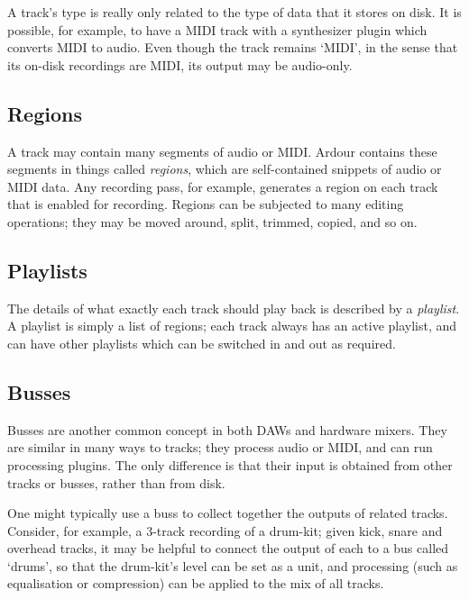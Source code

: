 \documentclass[10pt,a4paper]{book}
\begin{document}
\begin{danger}
A track's type is really only related to the type of data that it
stores on disk.  It is possible, for example, to have a MIDI track
with a synthesizer plugin which converts MIDI to audio.  Even though
the track remains `MIDI', in the sense that its on-disk recordings are
MIDI, its output may be audio-only.
\end{danger}


\subsection{Regions}

A track may contain many segments of audio or MIDI\@.  Ardour contains
these segments in things called \emph{regions}, which are
self-contained snippets of audio or MIDI data.  Any recording pass,
for example, generates a region on each track that is enabled for
recording.  Regions can be subjected to many editing operations; they
may be moved around, split, trimmed, copied, and so on.


\subsection{Playlists}

The details of what exactly each track should play back is described
by a \emph{playlist}.  A playlist is simply a list of regions; each
track always has an active playlist, and can have other playlists
which can be switched in and out as required.


\subsection{Busses}

Busses are another common concept in both DAWs and hardware mixers.
They are similar in many ways to tracks; they process audio or MIDI,
and can run processing plugins.  The only difference is that their
input is obtained from other tracks or busses, rather than from disk.

One might typically use a buss to collect together the outputs of
related tracks.  Consider, for example, a 3-track recording of a
drum-kit; given kick, snare and overhead tracks, it may be helpful to
connect the output of each to a bus called `drums', so that the
drum-kit's level can be set as a unit, and processing (such as
equalisation or compression) can be applied to the mix of all tracks.
\end{document}

